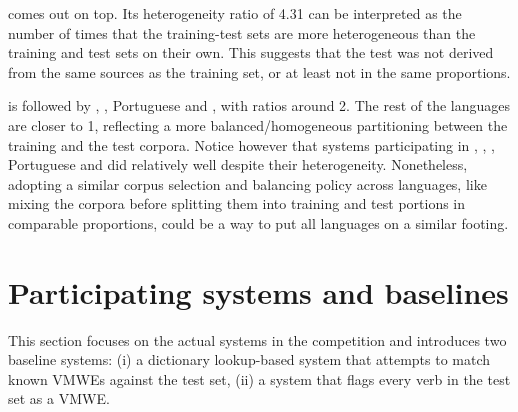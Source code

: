 \documentclass[output=paper,modfonts,nonflat,draftmode]{langsci/langscibook}
\begin{document}
 comes out on top. Its heterogeneity ratio of 4.31 can be interpreted as the number of times that the training-test sets are more heterogeneous than the training and test sets on their own. This suggests that the  test was not derived from the same sources as the training set, or at least not in the same proportions.

 is followed by , , Portuguese and , with ratios around 2. The rest of the languages are closer to 1, reflecting a more balanced/homogeneous partitioning between the training and the test corpora. Notice however that systems participating in , , , Portuguese and  did relatively well despite their heterogeneity. Nonetheless, adopting a similar corpus selection and balancing policy across languages, like mixing the corpora before splitting them into training and test portions in comparable proportions, could be a way to put all languages on a similar footing.

\section{\label{sec:systems}Participating systems and baselines}

This section focuses on the actual systems in the competition and introduces two baseline systems: (i) a dictionary lookup-based system that attempts to match known VMWEs against the test set, (ii) a system that flags every verb in the test set as a VMWE.
\end{document}
